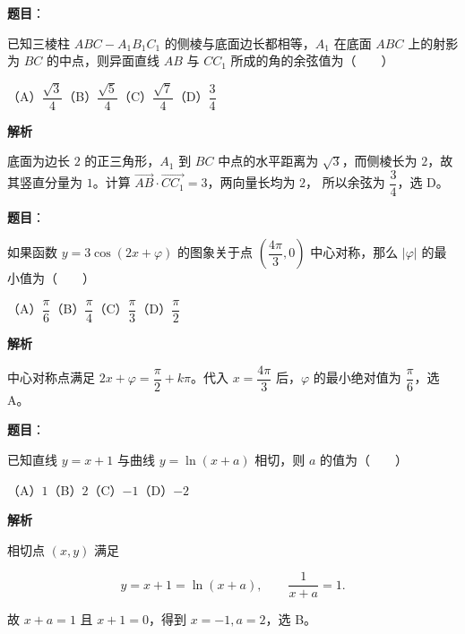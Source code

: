 \begin{answer}

\textbf{题目}：

已知三棱柱 $ABC-A_1B_1C_1$ 的侧棱与底面边长都相等，$A_1$ 在底面 $ABC$ 上的射影为 $BC$ 的中点，则异面直线 $AB$ 与 $CC_1$ 所成的角的余弦值为\mbox{（　　）}

（A）$\dfrac{\sqrt3}{4}$\quad（B）$\dfrac{\sqrt5}{4}$\quad（C）$\dfrac{\sqrt7}{4}$\quad（D）$\dfrac34$

\textbf{解析}

底面为边长 $2$ 的正三角形，$A_1$ 到 $BC$ 中点的水平距离为
$\sqrt3$，而侧棱长为 $2$，故其竖直分量为 $1$。计算
$\overrightarrow{AB}\cdot\overrightarrow{CC_1}=3$，两向量长均为 $2$，
所以余弦为 $\dfrac34$，选 D。


\end{answer}
\begin{answer}

\textbf{题目}：

如果函数 $y=3\cos(2x+\varphi)$ 的图象关于点 $\left(\dfrac{4\pi}{3},0\right)$ 中心对称，那么 $|\varphi|$ 的最小值为\mbox{（　　）}

（A）$\dfrac\pi6$\quad（B）$\dfrac\pi4$\quad（C）$\dfrac\pi3$\quad（D）$\dfrac\pi2$

\textbf{解析}

中心对称点满足 $2x+\varphi=\dfrac\pi2+k\pi$。代入
$x=\dfrac{4\pi}{3}$ 后，$\varphi$ 的最小绝对值为 $\dfrac\pi6$，选 A。


\end{answer}
\begin{answer}

\textbf{题目}：

已知直线 $y=x+1$ 与曲线 $y=\ln(x+a)$ 相切，则 $a$ 的值为\mbox{（　　）}

（A）$1$\quad（B）$2$\quad（C）$-1$\quad（D）$-2$

\textbf{解析}

相切点 $(x,y)$ 满足

\nopagebreak[4]
\[
y=x+1=\ln(x+a),\qquad \frac1{x+a}=1.
\]

故 $x+a=1$ 且 $x+1=0$，得到 $x=-1,a=2$，选 B。


\end{answer}
